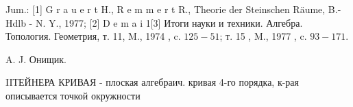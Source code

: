 \documentclass[10pt]{article}
\begin{document}
Jum.: [1] G r a u e r t H., R e m m e r t R., Theorie der Steinschen Räume, B.- Hdlb - N. Y., 1977; [2] D e m a i 1[3] Итоги науки и техники. Алгебра. Топология. Геометрия, т. 11, M., 1974 , c. $125-51$; т. 15 , M., 1977 , c. $93-171$.



A. J. Онищик.



IIТЕЙНЕРА КРИВАЯ - плоская алгебраич. кривая 4-го порядка, к-рая описывается точкой окружности
\end{document}
